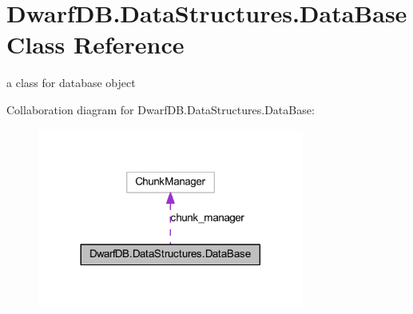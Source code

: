 \hypertarget{class_dwarf_d_b_1_1_data_structures_1_1_data_base}{
\section{DwarfDB.DataStructures.DataBase Class Reference}
\label{class_dwarf_d_b_1_1_data_structures_1_1_data_base}
}


a class for database object  




Collaboration diagram for DwarfDB.DataStructures.DataBase:
\nopagebreak
\begin{figure}[H]
\begin{center}
\leavevmode
\includegraphics[width=248pt]{class_dwarf_d_b_1_1_data_structures_1_1_data_base__coll__graph}
\end{center}
\end{figure}
